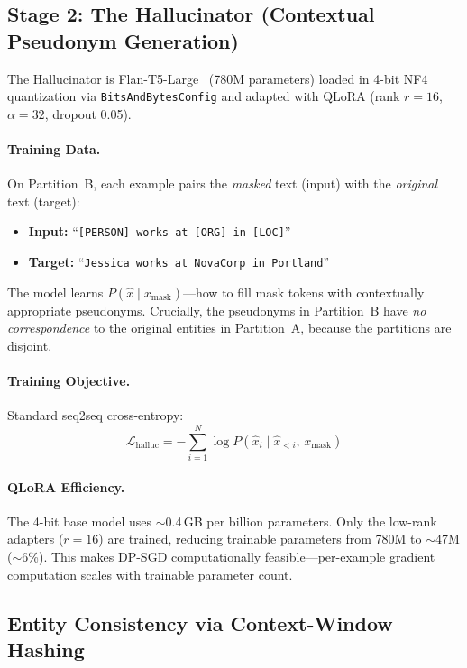 \documentclass[11pt, a4paper]{article}
\begin{document}
\subsection{Stage 2: The Hallucinator (Contextual Pseudonym Generation)}
\label{sec:halluc}

The Hallucinator is Flan-T5-Large~\cite{chung2022flan_t5} (780M
parameters) loaded in 4-bit NF4 quantization via
\texttt{BitsAndBytesConfig} and adapted with QLoRA (rank $r = 16$,
$\alpha = 32$, dropout 0.05).

\paragraph{Training Data.}
On Partition~B, each example pairs the \emph{masked} text (input) with
the \emph{original} text (target):
\begin{itemize}[leftmargin=*]
  \item \textbf{Input:} ``\texttt{[PERSON] works at [ORG] in [LOC]}''
  \item \textbf{Target:} ``\texttt{Jessica works at NovaCorp in Portland}''
\end{itemize}

The model learns $P(\hat{x} \mid x_{\text{mask}})$---how to fill mask
tokens with contextually appropriate pseudonyms.  Crucially, the
pseudonyms in Partition~B have \emph{no correspondence} to the original
entities in Partition~A, because the partitions are disjoint.

\paragraph{Training Objective.}
Standard seq2seq cross-entropy:
\begin{equation}
  \mathcal{L}_{\text{halluc}} = -\sum_{i=1}^{N}
    \log P(\hat{x}_i \mid \hat{x}_{<i},\, x_{\text{mask}})
  \label{eq:halluc_loss}
\end{equation}

\paragraph{QLoRA Efficiency.}
The 4-bit base model uses $\sim$0.4\,GB per billion parameters.
Only the low-rank adapters ($r=16$) are trained, reducing trainable
parameters from 780M to $\sim$47M ($\sim$6\%).  This makes DP-SGD
computationally feasible---per-example gradient computation scales
with trainable parameter count.

\subsection{Entity Consistency via Context-Window Hashing}
\label{sec:consistency}
\end{document}
